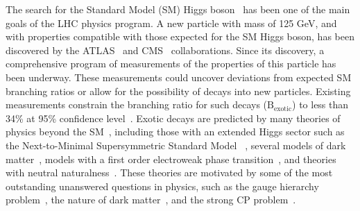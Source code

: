 %


The search for the Standard Model (SM) Higgs 
boson~\cite{Englert:1964et,Higgs:1964pj,Higgs:1964ia,Guralnik:1964eu}  
has been one of the main goals of the LHC physics program.  
A new particle with mass  of 125 GeV, and with  properties compatible with those expected for the SM Higgs boson, 
has been discovered by the ATLAS~\cite{HIGG-2012-27} and CMS~\cite{CMS-HIG-12-028} collaborations.
Since its discovery, a comprehensive program of measurements of the properties of this particle has been underway.
These measurements could uncover deviations from expected SM branching ratios or 
allow for the possibility of decays into new particles. 
Existing measurements constrain the branching ratio for such decays ($\text{B}_\text{exotic}$) 
to less than 34\% at 95\% confidence level~\cite{Khachatryan:2016vau}.
Exotic decays are predicted by many theories of physics beyond the SM~\cite{Curtin:2013fra},
including those with an extended Higgs sector 
such as the Next-to-Minimal Supersymmetric Standard Model 
~\cite{Dobrescu:2000yn,Ellwanger:2003jt,Dermisek:2005ar,Chang:2008cw,Morrissey:2008gm},
several models of dark matter~\cite{SILVEIRA1985136,Pospelov:2007mp,Draper:2010ew,Ipek:2014gua,Martin:2014sxa},
models with a first order electroweak phase transition~\cite{Profumo:2007wc,Blinov:2015sna},
and theories with neutral naturalness~\cite{Burdman:2006tz,Craig:2015pha,Curtin:2015fna}.
These theories are motivated by some of the most outstanding unanswered questions in physics, such as the gauge hierarchy problem~\cite{Nilles:1982dy}, the nature of dark matter~\cite{Trimble:1987ee}, and the strong CP problem~\cite{Peccei:1977hh}.

